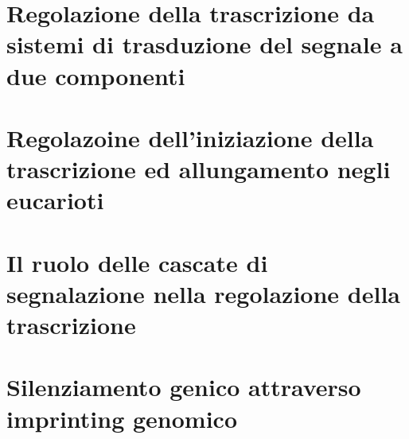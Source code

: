 \section{Regolazione della trascrizione da sistemi di trasduzione del segnale a due componenti}

\section{Regolazoine dell'iniziazione della trascrizione ed allungamento negli eucarioti}

\section{Il ruolo delle cascate di segnalazione nella regolazione della trascrizione}

\section{Silenziamento genico attraverso imprinting genomico}

